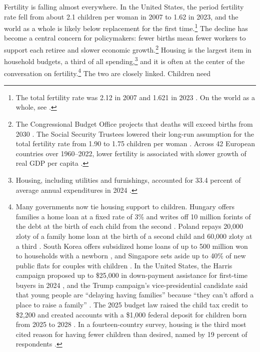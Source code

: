 

Fertility is falling almost everywhere. In the United States, the period
fertility rate fell from about 2.1 children per woman in 2007 to 1.62 in
2023, and the world as a whole is likely below replacement for the first
time.\footnote{The total fertility rate was 2.12 in 2007
\citep{cboDemographicOutlook2026} and 1.621 in 2023
\citep{ostermanBirthsFinal2023}. On the world as a whole, see
\citet{fernandezVillaverdeNorrickTerraIncognita2026}.} The decline has become a central concern
for policymakers: fewer births mean fewer workers to support each retiree
and slower economic growth.\footnote{The Congressional Budget Office projects
that deaths will exceed births from 2030 \citep{cboDemographicOutlook2026}.
The Social Security Trustees lowered their long-run assumption for the total
fertility rate from 1.90 to 1.75 children per woman \citep{ssaTrustees2026}.
Across 42 European countries over 1960--2022, lower fertility is associated
with slower growth of real GDP per capita \citep{cevikLostGenerations2025}.}
Housing is the largest item in household budgets, a third of all
spending,\footnote{Housing, including utilities and furnishings, accounted
for 33.4 percent of average annual expenditures in 2024
\citep{blsConsumerExpenditures2024}.} and it is often at the center of the
conversation on fertility.\footnote{Many governments now tie housing support to children.
Hungary offers families a home loan at a fixed rate of 3\% and writes off
10 million forints of the debt at the birth of each child from the second
\citep{hungaryCSOKPlus}. Poland repays 20,000 zloty of a family home loan at
the birth of a second child and 60,000 zloty at a third
\citep{polandFamilyRepayment}. South Korea offers subsidized home loans of up
to 500 million won to households with a newborn \citep{koreaNewbornLoan}, and
Singapore sets aside up to 40\% of new public flats for couples with children
\citep{singaporeFPPS}. In the United States, the Harris campaign proposed up
to \$25,000 in down-payment assistance for first-time buyers in 2024
\citep{harrisCampaign2024}, and the Trump campaign's vice-presidential
candidate said that young people are ``delaying having families'' because
``they can't afford a place to raise a family'' \citep{vanceNewsNation2024}.
The 2025 budget law raised the child tax credit to \$2,200 and created
accounts with a \$1,000 federal deposit for children born from 2025 to 2028
\citep{publicLaw119-21}. In a fourteen-country survey, housing is the third
most cited reason for having fewer children than desired, named by 19
percent of respondents \citep{unfpaSWP2025}.} The two are closely linked. Children need

